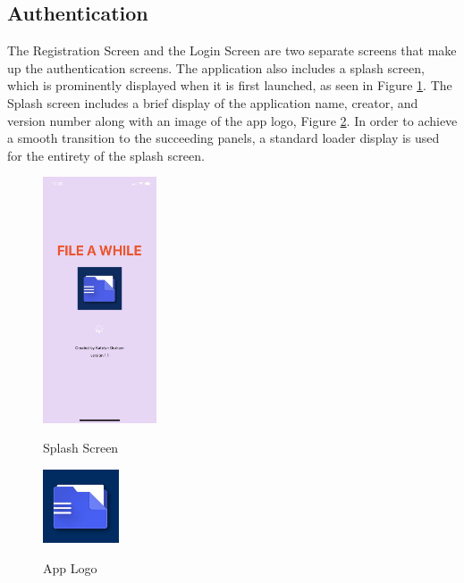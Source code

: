 \subsection{Authentication}
The Registration Screen and the Login Screen are two separate screens that make up the authentication screens. The application also includes a splash screen, which is prominently displayed when it is first launched, as seen in Figure \ref{image:splash}. The Splash screen includes a brief display of the application name, creator, and version number along with an image of the app logo, Figure \ref{image:logo}. In order to achieve a smooth transition to the succeeding panels, a standard loader display is used for the entirety of the splash screen.
\begin{figure}[h!]
    \includegraphics[width=0.3\textwidth]
    {images/SplashScreen.png}
    \centering
    \label{image:splash}
    \caption{Splash Screen}
\end{figure}

\begin{figure}[h!]
    \includegraphics[width=0.2\textwidth]
    {images/FileLogo.png}
    \centering
    \label{image:logo}
    \caption{App Logo}
\end{figure}

